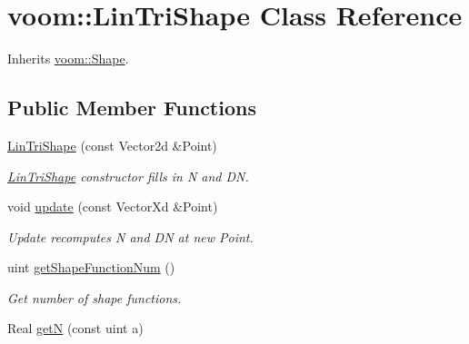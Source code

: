 \hypertarget{classvoom_1_1_lin_tri_shape}{
\section{voom::LinTriShape Class Reference}
\label{classvoom_1_1_lin_tri_shape}
}


Inherits \hyperlink{classvoom_1_1_shape}{voom::Shape}.\subsection*{Public Member Functions}
\begin{DoxyCompactItemize}
\item 
\hypertarget{classvoom_1_1_lin_tri_shape_a740279ed3bb681319609d34ce2a3a466}{
\hyperlink{classvoom_1_1_lin_tri_shape_a740279ed3bb681319609d34ce2a3a466}{LinTriShape} (const Vector2d \&Point)}
\label{classvoom_1_1_lin_tri_shape_a740279ed3bb681319609d34ce2a3a466}

\begin{DoxyCompactList}\small\item\em \hyperlink{classvoom_1_1_lin_tri_shape}{LinTriShape} constructor fills in N and DN. \item\end{DoxyCompactList}\item 
void \hyperlink{classvoom_1_1_lin_tri_shape_a3802bf83a7e1ee9310bdb6d6558bd7ad}{update} (const VectorXd \&Point)
\begin{DoxyCompactList}\small\item\em Update recomputes N and DN at new Point. \item\end{DoxyCompactList}\item 
\hypertarget{classvoom_1_1_lin_tri_shape_a70e28bcfeeb2e7112b19367ab4515624}{
uint \hyperlink{classvoom_1_1_lin_tri_shape_a70e28bcfeeb2e7112b19367ab4515624}{getShapeFunctionNum} ()}
\label{classvoom_1_1_lin_tri_shape_a70e28bcfeeb2e7112b19367ab4515624}

\begin{DoxyCompactList}\small\item\em Get number of shape functions. \item\end{DoxyCompactList}\item 
\hypertarget{classvoom_1_1_lin_tri_shape_a75eecf97b645e1993d896000c8c63589}{
Real \hyperlink{classvoom_1_1_lin_tri_shape_a75eecf97b645e1993d896000c8c63589}{getN} (const uint a)}
\label{classvoom_1_1_lin_tri_shape_a75eecf97b645e1993d896000c8c63589}


\end{DoxyCompactItemize}
